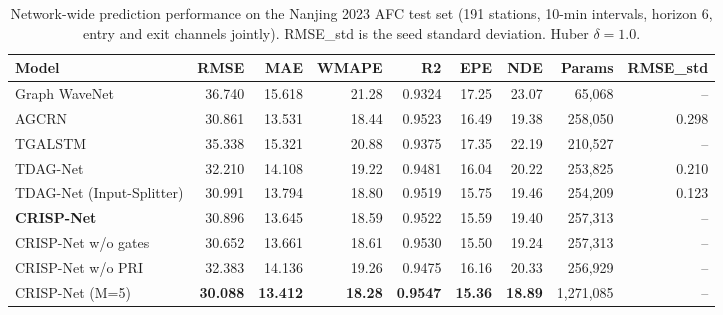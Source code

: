 \begin{table}[!t]
\caption{Network-wide prediction performance on the Nanjing 2023 AFC test set (191 stations, 10-min intervals, horizon 6, entry and exit channels jointly). RMSE\_std is the seed standard deviation. Huber $\delta=1.0$.}
\label{tab:main_results}
\centering
\footnotesize
\begin{tabular}{lrrrrrrrr}
\toprule
Model & RMSE & MAE & WMAPE & R2 & EPE & NDE & Params & RMSE_std \\
\midrule
Graph WaveNet & 36.740 & 15.618 & 21.28 & 0.9324 & 17.25 & 23.07 & 65,068 & -- \\
AGCRN & 30.861 & 13.531 & 18.44 & 0.9523 & 16.49 & 19.38 & 258,050 & 0.298 \\
TGALSTM & 35.338 & 15.321 & 20.88 & 0.9375 & 17.35 & 22.19 & 210,527 & -- \\
TDAG-Net & 32.210 & 14.108 & 19.22 & 0.9481 & 16.04 & 20.22 & 253,825 & 0.210 \\
TDAG-Net (Input-Splitter) & 30.991 & 13.794 & 18.80 & 0.9519 & 15.75 & 19.46 & 254,209 & 0.123 \\
\textbf{CRISP-Net} & 30.896 & 13.645 & 18.59 & 0.9522 & 15.59 & 19.40 & 257,313 & -- \\
CRISP-Net w/o gates & 30.652 & 13.661 & 18.61 & 0.9530 & 15.50 & 19.24 & 257,313 & -- \\
CRISP-Net w/o PRI & 32.383 & 14.136 & 19.26 & 0.9475 & 16.16 & 20.33 & 256,929 & -- \\
CRISP-Net (M=5) & \textbf{30.088} & \textbf{13.412} & \textbf{18.28} & \textbf{0.9547} & \textbf{15.36} & \textbf{18.89} & 1,271,085 & -- \\
\bottomrule
\end{tabular}
\end{table}

